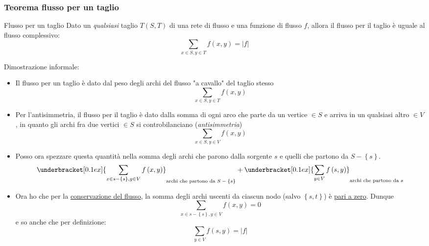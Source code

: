 \subsubsection{Teorema flusso per un taglio}
\begin{teorema}{Flusso per un taglio}
	Dato un \textit{qualsiasi} taglio $ T \left(S, T\right) $ di una rete di flusso e una funzione di flusso $ f $, allora il flusso per il taglio è uguale al flusso complessivo:
	\[
		\sum_{x \in S,  y \in T} f\left(x,y\right) = \left|f\right|
	\]
\end{teorema}\label{flusso per taglio}
Dimostrazione informale:
\begin{itemize}
	\item Il flusso per un taglio è dato dal peso degli archi del flusso "a cavallo" del taglio stesso
	      \[
		      \sum_{x \in S, y \in T}f \left(x,y\right)
	      \]
	\item Per l'antisimmetria, il flusso per il taglio è dato dalla somma di ogni arco che parte da un vertice $ \in S $ e arriva in un qualsiasi altro $ \in V $, in quanto gli archi fra due vertici $ \in S $ si controbilanciano (\textit{antisimmetria})
	      \[
		      \sum_{x \in S, y \in V}f \left(x,y\right)
	      \]
	\item Posso ora spezzare questa quantità nella somma degli archi che parono dalla sorgente $ s $ e quelli che partono da $ S - \left\{s\right\} $.
	      \[
		      \underbracket[0.1ex]{\sum_{x \in s - \left\{s\right\}, y \in V} f\left(x,y\right)}_{\text{archi che partono da $ S - \left\{s\right\} $}} + \underbracket[0.1ex]{\sum_{y \in V} f\left(s,y\right)}_{\text{archi che partono da $ s $}}
	      \]
	\item Ora ho che per la \hyperref[conservazione del flusso]{conservazione del flusso}, la somma degli archi uscenti da ciascun nodo (salvo $ \left\{s, t\right\} $) è \underline{pari a zero}. Dunque
	      \[
		      \sum_{x \in s - \left\{s\right\}, y \in V} f\left(x,y\right) = 0
	      \]
	      e so anche che per definizione:
	      \[
		      \sum_{y \in V} f\left(s,y\right) = \left|f\right|
	      \]
\end{itemize}
